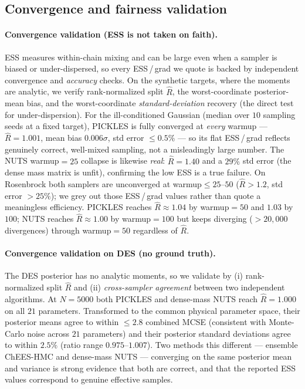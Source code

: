 \documentclass{article}
\begin{document}
\subsection{Convergence and fairness validation}\label{ssec:validation}

\paragraph{Convergence validation (ESS is not taken on faith).}
ESS measures within-chain mixing and can be large even when a sampler is
biased or under-dispersed, so every ESS\,/\,grad we quote is backed by
independent convergence and \emph{accuracy} checks. On the synthetic
targets, where the moments are analytic, we verify rank-normalized split
$\hat R$, the worst-coordinate posterior-mean bias, and the
worst-coordinate \emph{standard-deviation} recovery (the direct test for
under-dispersion). For the ill-conditioned Gaussian (median over $10$ sampling seeds at a
fixed target), PICKLES is fully converged at \emph{every} warmup ---
$\hat R=1.001$, mean bias $0.006\sigma$, std error $\le\!0.5\%$ --- so its
flat ESS\,/\,grad reflects genuinely correct, well-mixed sampling, not a
misleadingly large number. The NUTS warmup$=25$ collapse is likewise
\emph{real}: $\hat R=1.40$ and a $29\%$ std error (the dense mass matrix
is unfit), confirming the low
ESS is a true failure. On Rosenbrock both samplers are unconverged at
warmup$\le25$--$50$ ($\hat R>1.2$, std error $>25\%$); we grey out those
ESS\,/\,grad values rather than quote a meaningless efficiency. PICKLES
reaches $\hat R\!\approx\!1.04$ by warmup$=50$ and $1.03$ by $100$; NUTS
reaches $\hat R\!\approx\!1.00$ by warmup$=100$ but keeps diverging
($>\!20{,}000$ divergences) through warmup$=50$ regardless of $\hat R$.

\paragraph{Convergence validation on DES (no ground truth).}
The DES posterior has no analytic moments, so we validate by (i)
rank-normalized split $\hat R$ and (ii) \emph{cross-sampler agreement}
between two independent algorithms. At $N=5000$ both PICKLES and
dense-mass NUTS reach $\hat R=1.000$ on all $21$ parameters. Transformed
to the common physical parameter space, their posterior means agree to
within $\le\!2.8$ combined MCSE (consistent with Monte-Carlo noise across
$21$ parameters) and their posterior standard deviations agree to within
$2.5\%$ (ratio range $0.975$--$1.007$). Two methods this different ---
ensemble ChEES-HMC and dense-mass NUTS --- converging on the same
posterior mean and variance is strong evidence that both are correct, and
that the reported ESS values correspond to genuine effective samples.
\end{document}
